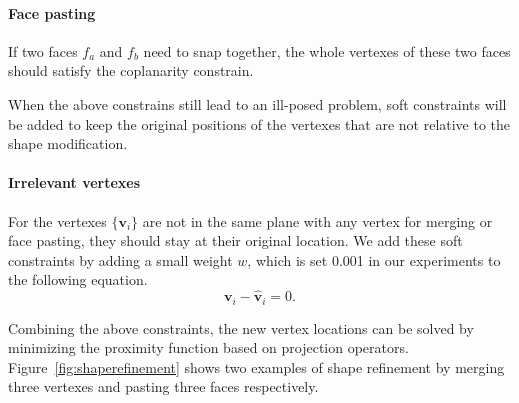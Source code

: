 {\paragraph{Face pasting}
If two faces $f_a$ and $f_b$ need to snap together, the whole vertexes of these two faces should satisfy the coplanarity constrain.


When the above constrains still lead to an ill-posed problem, soft constraints will be added to keep the original positions of the vertexes that are not relative to the shape modification. 

\paragraph{Irrelevant vertexes} For the vertexes $\{\mathbf{v}_i\}$ are not in the same plane with any vertex for merging or face pasting, they should stay at their original location. 
We add these soft constraints by adding a small weight $w$, which is set 0.001 in our experiments to the following equation. 
\begin{equation}
\mathbf{v}_i - \mathbf{\hat{v}}_i = 0.
\label{equ:irrelevant}
\end{equation}

Combining the above constraints, the new vertex locations can be solved by minimizing the proximity function based on projection operators\cite{Bouaziz:2012:SSD:2346796.2346802}.
%
Figure~\ref{fig:shaperefinement} shows two examples of shape refinement by merging three vertexes and pasting three faces respectively. 

}
